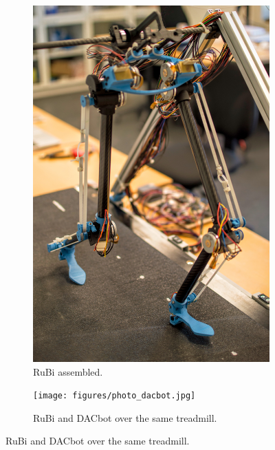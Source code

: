 \begin{figure}[ht!]
    \centering
    \begin{subfigure}[b]{0.49\textwidth}
        \includegraphics[width=\textwidth]{figures/photo_robot_walking.jpg}
        \caption{RuBi assembled.}
        \label{fig:photo_robot_walking}
    \end{subfigure}
    \begin{subfigure}[b]{0.49\textwidth}
        \texttt{[image: figures/photo\_dacbot.jpg]}
        \caption{RuBi and DACbot over the same treadmill.}
        \label{fig:photo_dacbot}
    \end{subfigure}
\end{figure}    
